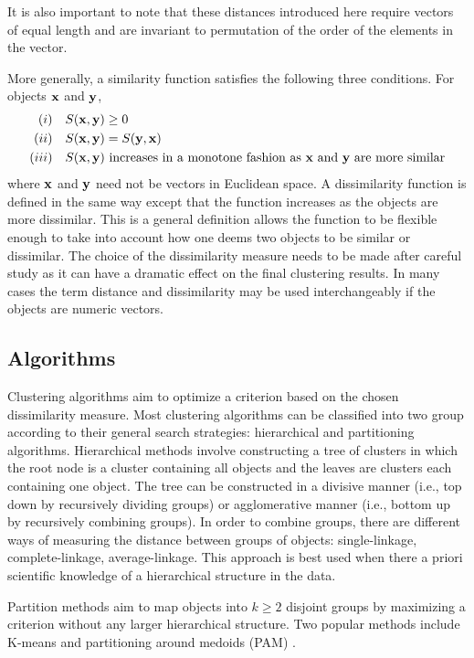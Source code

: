 It is also important to note that these distances introduced here require vectors of equal length and are invariant to permutation of the order of the elements in the vector.

More generally, a similarity function satisfies the following three conditions. For objects $\mathbf x$ and $\mathbf y$,
\begin{align*}
(i)&\quad S(\mathbf x,\mathbf y)\geq 0 \\
(ii)&\quad S(\mathbf x,\mathbf y) = S(\mathbf y,\mathbf x)\\
(iii)& \quad S(\mathbf x,\mathbf y)\text{ increases in a monotone fashion as }\mathbf x\text{ and }\mathbf y\text{ are more similar}
\end{align*}
where $\mathbf x$ and $\mathbf y$ need not be vectors in Euclidean space. A dissimilarity function is defined in the same way except that the function increases as the objects are more dissimilar. This is a general definition allows the function to be flexible enough to take into account how one deems two objects to be similar or dissimilar. The choice of the dissimilarity measure needs to be made after careful study as it can have a dramatic effect on the final clustering results. In many cases the term distance and dissimilarity may be used interchangeably if the objects are numeric vectors. 

\subsection{Algorithms}
Clustering algorithms aim to optimize a criterion based on the chosen dissimilarity measure. Most clustering algorithms can be classified into two group according to their general search strategies: hierarchical and partitioning algorithms. Hierarchical methods involve constructing a tree of clusters in which the root node is a cluster containing all objects and the leaves are clusters each containing one object. The tree can be constructed in a divisive manner (i.e., top down by recursively dividing groups) or agglomerative manner (i.e., bottom up by recursively combining groups). In order to combine groups, there are different ways of measuring the distance between groups of objects: single-linkage, complete-linkage, average-linkage. This approach is best used when there a priori scientific knowledge of a hierarchical structure in the data.

Partition methods aim to map objects into $k\geq 2$ disjoint groups by maximizing a criterion without any larger hierarchical structure. Two popular methods include K-means \cite{macqueen1967,hartigan1979} and partitioning around medoids (PAM) \cite{kaufman1990}. 

